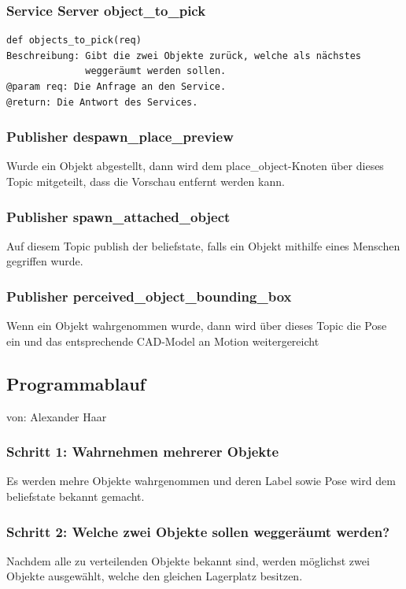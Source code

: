 \documentclass{suturo}
\makeatletter
\newcommand{\chapterauthor}[1]{%
  {\parindent0pt\vspace*{-27pt}%
  \linespread{0}\small\begin{flushright}von: #1\end{flushright}%
  \par\nobreak\vspace*{0pt}}
  \@afterheading%
}
\makeatother
\begin{document}
\subsubsection{Service Server object\_to\_pick}
\begin{verbatim}
def objects_to_pick(req)
Beschreibung: Gibt die zwei Objekte zurück, welche als nächstes 
              weggeräumt werden sollen.
@param req: Die Anfrage an den Service.
@return: Die Antwort des Services.
\end{verbatim}

\subsubsection{Publisher despawn\_place\_preview}
Wurde ein Objekt abgestellt, dann wird dem place\_object-Knoten über dieses Topic mitgeteilt, dass die Vorschau entfernt werden kann.

\subsubsection{Publisher spawn\_attached\_object}
Auf diesem Topic publish der beliefstate, falls ein Objekt mithilfe eines Menschen gegriffen wurde.

\subsubsection{Publisher perceived\_object\_bounding\_box}
Wenn ein Objekt wahrgenommen wurde, dann wird über dieses Topic die Pose ein und das entsprechende CAD-Model an Motion weitergereicht

\subsection{Programmablauf}
\chapterauthor{Alexander Haar}
\subsubsection{Schritt 1: Wahrnehmen mehrerer Objekte}
Es werden mehre Objekte wahrgenommen und deren Label sowie Pose wird dem beliefstate bekannt gemacht.

\subsubsection{Schritt 2: Welche zwei Objekte sollen weggeräumt werden?}
Nachdem alle zu verteilenden Objekte bekannt sind, werden möglichst zwei Objekte ausgewählt, welche den gleichen Lagerplatz besitzen.
\end{document}
